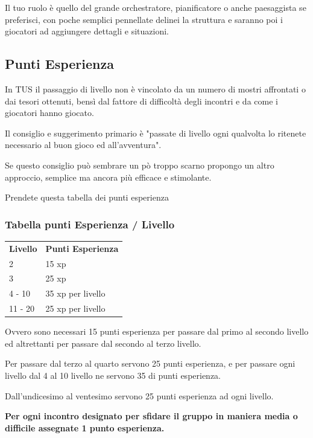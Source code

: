 \documentclass[a4paper,11pt,twoside,openany]{book}
\begin{document}
{Il tuo ruolo è quello del grande orchestratore, pianificatore o anche paesaggista se preferisci, con poche semplici pennellate delinei la struttura e saranno poi i giocatori ad aggiungere dettagli e situazioni.



\subsection{Punti Esperienza}

\label{punti-esperienza}

In TUS il passaggio di livello non è vincolato da un numero di mostri affrontati o dai tesori ottenuti, bensì dal fattore di difficoltà degli incontri e da come i giocatori hanno giocato.

Il consiglio e suggerimento primario è "passate di livello ogni qualvolta lo ritenete necessario al buon gioco ed all'avventura".

Se questo consiglio può sembrare un pò troppo scarno propongo un altro approccio, semplice ma ancora più efficace e stimolante.

Prendete questa tabella dei punti esperienza

\subsubsection{Tabella punti Esperienza / Livello}

\label{tabella-punti-esperienza-livello}

\begin{tabular}{ll}
\toprule
\textbf{Livello} & \textbf{Punti Esperienza}\tabularnewline
2 & 15 xp\tabularnewline
3 & 25 xp\tabularnewline
4 - 10 & 35 xp per livello\tabularnewline
11 - 20 & 25 xp per livello\tabularnewline
\end{tabular}

\bigskip

Ovvero sono necessari 15 punti esperienza per passare dal primo al secondo livello ed altrettanti per passare dal secondo al terzo livello.

Per passare dal terzo al quarto servono 25 punti esperienza, e per passare ogni livello dal 4 al 10 livello ne servono 35 di punti esperienza.

Dall'undicesimo al ventesimo servono 25 punti esperienza ad ogni livello.

\textbf{Per ogni incontro designato per sfidare il gruppo in maniera media o difficile assegnate 1 punto esperienza.}

}
\end{document}
